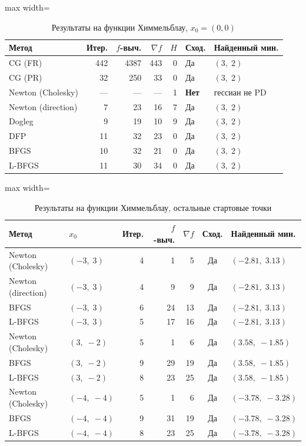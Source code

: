 \documentclass[12pt]{article}
\begin{document}
\begin{table}[H]
\centering
\caption{Результаты на функции Химмельблау, $x_0 = (0, 0)$}
\begin{adjustbox}{max width=\textwidth}
\begin{tabular}{lrrrrll}
\toprule
\textbf{Метод} & \textbf{Итер.} & \textbf{$f$-выч.} & \textbf{$\nabla f$} & \textbf{$H$} & \textbf{Сход.} & \textbf{Найденный мин.} \\
\midrule
CG (FR)            & 442  & 4387 & 443  & 0  & Да  & $(3,\;2)$ \\
CG (PR)            & 32   & 250  & 33   & 0  & Да  & $(3,\;2)$ \\
Newton (Cholesky)  & ---  & ---  & ---  & 1  & \textbf{Нет} & гессиан не PD \\
Newton (direction) & 7    & 23   & 16   & 7  & Да  & $(3,\;2)$ \\
Dogleg             & 9    & 19   & 10   & 9  & Да  & $(3,\;2)$ \\
DFP                & 11   & 32   & 23   & 0  & Да  & $(3,\;2)$ \\
BFGS               & 10   & 32   & 21   & 0  & Да  & $(3,\;2)$ \\
L-BFGS             & 11   & 30   & 34   & 0  & Да  & $(3,\;2)$ \\
\bottomrule
\end{tabular}
\end{adjustbox}
\end{table}

\begin{table}[H]
\centering
\caption{Результаты на функции Химмельблау, остальные стартовые точки}
\begin{adjustbox}{max width=\textwidth}
\begin{tabular}{llrrrcl}
\toprule
\textbf{Метод} & $x_0$ & \textbf{Итер.} & \textbf{$f$-выч.} & \textbf{$\nabla f$} & \textbf{Сход.} & \textbf{Найденный мин.} \\
\midrule
Newton (Cholesky) & $(-3,\;3)$   & 4 & 1  & 5  & Да & $(-2.81,\;3.13)$ \\
Newton (direction) & $(-3,\;3)$  & 4 & 9  & 9  & Да & $(-2.81,\;3.13)$ \\
BFGS              & $(-3,\;3)$   & 6 & 24 & 13 & Да & $(-2.81,\;3.13)$ \\
L-BFGS            & $(-3,\;3)$   & 5 & 17 & 16 & Да & $(-2.81,\;3.13)$ \\
\midrule
Newton (Cholesky) & $(3,\;-2)$   & 5 & 1  & 6  & Да & $(3.58,\;-1.85)$ \\
BFGS              & $(3,\;-2)$   & 9 & 29 & 19 & Да & $(3.58,\;-1.85)$ \\
L-BFGS            & $(3,\;-2)$   & 8 & 23 & 25 & Да & $(3.58,\;-1.85)$ \\
\midrule
Newton (Cholesky) & $(-4,\;-4)$  & 5 & 1  & 6  & Да & $(-3.78,\;-3.28)$ \\
BFGS              & $(-4,\;-4)$  & 9 & 31 & 19 & Да & $(-3.78,\;-3.28)$ \\
L-BFGS            & $(-4,\;-4)$  & 8 & 23 & 25 & Да & $(-3.78,\;-3.28)$ \\
\bottomrule
\end{tabular}
\end{adjustbox}
\end{table}
\end{document}
